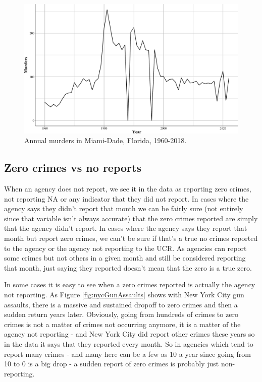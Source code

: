 \documentclass[
  12pt,
  openany]{book}
\begin{document}
\begin{figure}

{\centering \includegraphics[width=0.9\linewidth]{ucrbook_files/figure-latex/miamiDadeMurderAnnual-1} 

}

\caption{Annual murders in Miami-Dade, Florida, 1960-2018.}\label{fig:miamiDadeMurderAnnual}
\end{figure}

\hypertarget{zero-crimes-vs-no-reports}{%
\subsection{Zero crimes vs no reports}\label{zero-crimes-vs-no-reports}}

When an agency does not report, we see it in the data as reporting zero crimes, not reporting NA or any indicator that they did not report. In cases where the agency says they didn't report that month we can be fairly sure (not entirely since that variable isn't always accurate) that the zero crimes reported are simply that the agency didn't report. In cases where the agency says they report that month but report zero crimes, we can't be sure if that's a true no crimes reported to the agency or the agency not reporting to the UCR. As agencies can report some crimes but not others in a given month and still be considered reporting that month, just saying they reported doesn't mean that the zero is a true zero.

In some cases it is easy to see when a zero crimes reported is actually the agency not reporting. As Figure \ref{fig:nycGunAssaults} shows with New York City gun assaults, there is a massive and sustained dropoff to zero crimes and then a sudden return years later. Obviously, going from hundreds of crimes to zero crimes is not a matter of crimes not occurring anymore, it is a matter of the agency not reporting - and New York City did report other crimes these years so in the data it says that they reported every month. So in agencies which tend to report many crimes - and many here can be a few as 10 a year since going from 10 to 0 is a big drop - a sudden report of zero crimes is probably just non-reporting.
\end{document}
